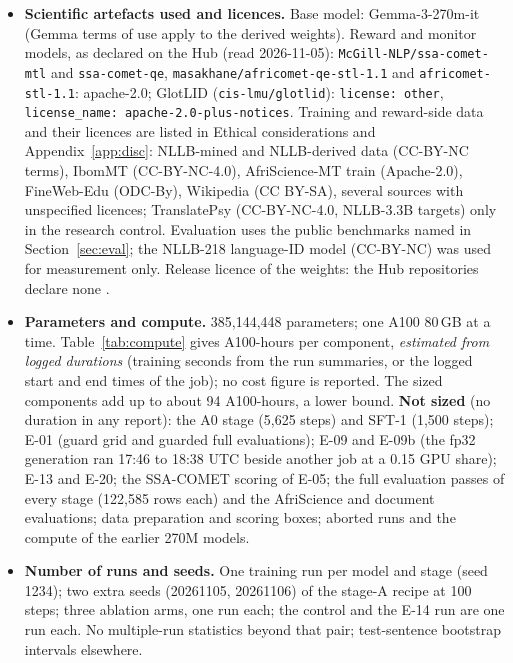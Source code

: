 \begin{itemize}
\item \textbf{Scientific artefacts used and licences.} Base model: Gemma-3-270m-it (Gemma terms of use apply to the derived weights). Reward and monitor models, as declared on the Hub (read 2026-11-05): \texttt{McGill-NLP/ssa-comet-mtl} and \texttt{ssa-comet-qe}, \texttt{masakhane/africomet-qe-stl-1.1} and \texttt{africomet-stl-1.1}: apache-2.0; GlotLID (\texttt{cis-lmu/glotlid}): \texttt{license: other}, \texttt{license\_name: apache-2.0-plus-notices}. Training and reward-side data and their licences are listed in Ethical considerations and Appendix~\ref{app:disc}: NLLB-mined and NLLB-derived data (CC-BY-NC terms), IbomMT (CC-BY-NC-4.0), AfriScience-MT train (Apache-2.0), FineWeb-Edu (ODC-By), Wikipedia (CC BY-SA), several sources with unspecified licences; TranslatePsy (CC-BY-NC-4.0, NLLB-3.3B targets) only in the research control. Evaluation uses the public benchmarks named in Section~\ref{sec:eval}; the NLLB-218 language-ID model (CC-BY-NC) was used for measurement only. Release licence of the weights: the Hub repositories declare none .
\item \textbf{Parameters and compute.} 385,144,448 parameters; one A100 80\,GB at a time. Table~\ref{tab:compute} gives A100-hours per component, \emph{estimated from logged durations} (training seconds from the run summaries, or the logged start and end times of the job); no cost figure is reported. The sized components add up to about 94 A100-hours, a lower bound. \textbf{Not sized} (no duration in any report): the A0 stage (5,625 steps) and SFT-1 (1,500 steps); E-01 (guard grid and guarded full evaluations); E-09 and E-09b (the fp32 generation ran 17:46 to 18:38 UTC beside another job at a 0.15 GPU share); E-13 and E-20; the SSA-COMET scoring of E-05; the full evaluation passes of every stage (122,585 rows each) and the AfriScience and document evaluations; data preparation and scoring boxes; aborted runs and the compute of the earlier 270M models.
\item \textbf{Number of runs and seeds.} One training run per model and stage (seed 1234); two extra seeds (20261105, 20261106) of the stage-A recipe at 100 steps; three ablation arms, one run each; the control and the E-14 run are one run each. No multiple-run statistics beyond that pair; test-sentence bootstrap intervals elsewhere.

\end{itemize}
